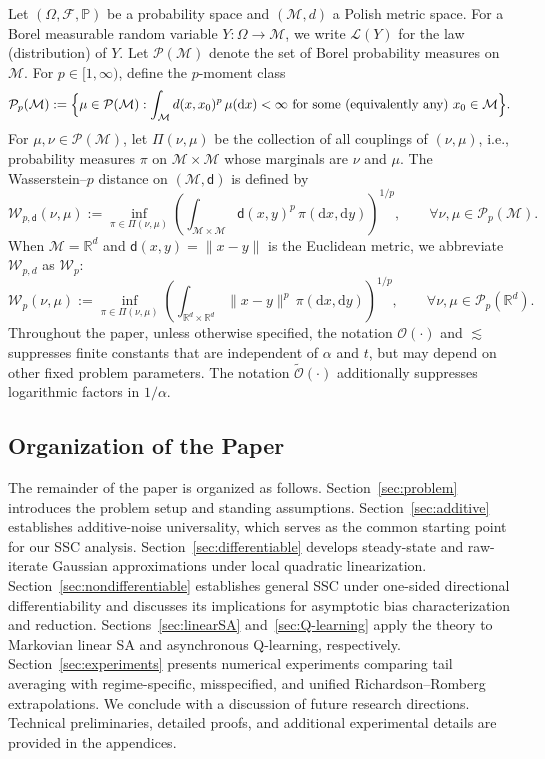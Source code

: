 \documentclass[11pt,letterpaper]{article}
\theoremstyle{plain}
\theoremstyle{definition}
\theoremstyle{remark}
\begin{document}
Let $(\Omega,\mathcal F,\mathbb P)$ be a probability space and $(\mathcal M,d)$ a
Polish metric space. For a Borel measurable random variable
$Y:\Omega\to\mathcal M$, we write $\mathcal L(Y)$ for the law (distribution) of
$Y$. Let $\mathcal P(\mathcal M)$ denote the set of Borel probability measures on
$\mathcal M$. For $p\in[1,\infty)$, define the $p$-moment class
\[
\mathcal P_p(\mathcal M)
:=\Bigl\{\mu\in\mathcal P(\mathcal M): \int_{\mathcal M} d(x,x_0)^p\,\mu(\mathrm dx)
<\infty \text{ for some (equivalently any) } x_0\in\mathcal M\Bigr\}.
\]
For $\mu,\nu\in\mathcal P(\mathcal M)$, let $\Pi(\nu,\mu)$ be the collection of
all couplings of $(\nu,\mu)$, i.e., probability measures $\pi$ on
$\mathcal M\times\mathcal M$ whose marginals are $\nu$ and $\mu$. The
Wasserstein--$p$ distance on $(\mathcal M,\mathsf d)$ is defined by
\[
\mathcal W_{p,\mathsf d}(\nu,\mu)
:=
\inf_{\pi\in\Pi(\nu,\mu)}
\left(
\int_{\mathcal M\times\mathcal M} \mathsf d(x,y)^p \,\pi(\mathrm dx,\mathrm dy)
\right)^{1/p}, \qquad \forall\nu,\mu\in\mathcal P_p(\mathcal M).
\]
When $\mathcal M=\mathbb R^d$ and $\mathsf d(x,y)=\|x-y\|$ is the Euclidean metric, we abbreviate
$\mathcal W_{p,d}$ as $\mathcal W_p$:
\[
\mathcal W_p(\nu,\mu)
:=
\inf_{\pi\in\Pi(\nu,\mu)}
\left(
\int_{\mathbb R^d\times\mathbb R^d} \|x-y\|^p \,\pi(\mathrm dx,\mathrm dy)
\right)^{1/p},
\qquad \forall \nu,\mu \in \mathcal P_p(\mathbb R^d).
\]
Throughout the paper, unless otherwise specified, the notation
\(\mathcal O(\cdot)\) and \(\lesssim\) suppresses finite constants that are
independent of \(\alpha\) and \(t\), but may depend on other fixed problem
parameters. The notation \(\widetilde{\mathcal O}(\cdot)\) additionally
suppresses logarithmic factors in \(1/\alpha\).

\subsection{Organization of the Paper}
The remainder of the paper is organized as follows.
Section~\ref{sec:problem} introduces the problem setup and standing
assumptions.
Section~\ref{sec:additive} establishes additive-noise universality, which
serves as the common starting point for our SSC analysis.
Section~\ref{sec:differentiable} develops steady-state and raw-iterate
Gaussian approximations under local quadratic linearization.
Section~\ref{sec:nondifferentiable} establishes general SSC under one-sided
directional differentiability  and discusses its implications for asymptotic bias
characterization and reduction.
Sections~\ref{sec:linearSA} and~\ref{sec:Q-learning} apply the theory to
Markovian linear SA and asynchronous Q-learning, respectively.
Section~\ref{sec:experiments} presents numerical experiments comparing
tail averaging with regime-specific, misspecified, and unified
Richardson--Romberg extrapolations.
We conclude with a discussion of future research directions.
Technical preliminaries, detailed proofs, and additional experimental
details are provided in the appendices.
\end{document}
